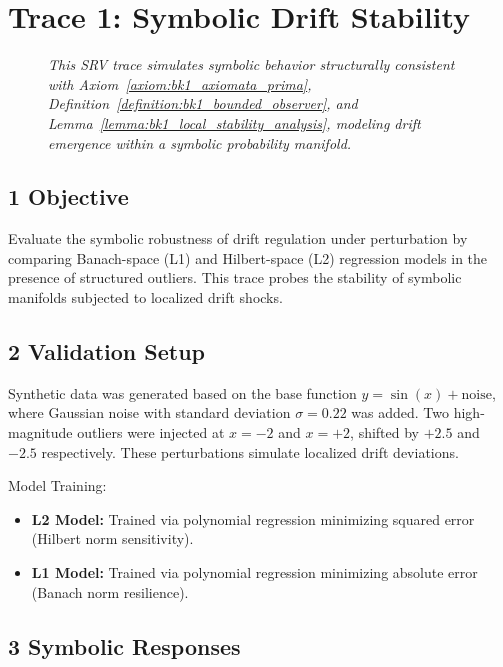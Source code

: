 \section*{Trace 1: Symbolic Drift Stability}
\label{section:trace1_symbolic_drift_stability}

\begin{figure}[htbp]
\centering
\caption[\textit{SRV trace (summary)}]{\textit{This SRV trace simulates symbolic behavior structurally consistent with Axiom~\ref{axiom:bk1_axiomata_prima}, Definition~\ref{definition:bk1_bounded_observer}, and Lemma~\ref{lemma:bk1_local_stability_analysis}, modeling drift emergence within a symbolic probability manifold.}}
\label{figure:trace1_drift_stability_summary}
\end{figure}

\subsection*{1 Objective}
\label{subsection:trace1_objective}

Evaluate the symbolic robustness of drift regulation under perturbation by comparing Banach-space (L1) and Hilbert-space (L2) regression models in the presence of structured outliers. This trace probes the stability of symbolic manifolds subjected to localized drift shocks.

\subsection*{2 Validation Setup}
\label{subsection:trace1_validation_setup}

Synthetic data was generated based on the base function $y = \sin(x) + \text{noise}$, where Gaussian noise with standard deviation $\sigma = 0.22$ was added. Two high-magnitude outliers were injected at $x = -2$ and $x = +2$, shifted by $+2.5$ and $-2.5$ respectively. These perturbations simulate localized drift deviations.

Model Training:
\begin{itemize}
    \item \textbf{L2 Model:} Trained via polynomial regression minimizing squared error (Hilbert norm sensitivity).
    \item \textbf{L1 Model:} Trained via polynomial regression minimizing absolute error (Banach norm resilience).
\end{itemize}

\subsection*{3 Symbolic Responses}
\label{subsection:trace1_symbolic_responses}

